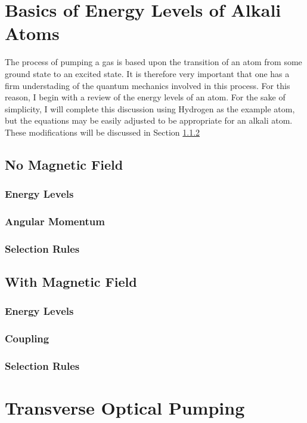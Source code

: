 \documentclass[letter,12pt]{article}
\begin{document}
\section{Basics of Energy Levels of Alkali Atoms}
The process of pumping a gas is based upon the transition
of an atom from some ground state to an excited state. 
It is therefore very important that one has a firm 
understading of the quantum mechanics involved in this 
process. For this reason, I begin with a review of the energy
levels of an atom. For the sake of simplicity, I will complete
this discussion using
Hydrogen as the example atom, but the equations may be 
easily adjusted to be appropriate for an alkali atom.
These modifications will be discussed in Section \ref{angularMomentum}
	\subsection{No Magnetic Field}
		\subsubsection{Energy Levels}
		\subsubsection{Angular Momentum}
        \label{angularMomentum}
		\subsubsection{Selection Rules}

	\subsection{With Magnetic Field}
		\subsubsection{Energy Levels}
		\subsubsection{Coupling}
		\subsubsection{Selection Rules}

\section{Transverse Optical Pumping}
\end{document}
